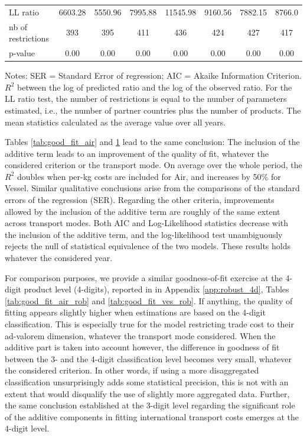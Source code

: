 \documentclass[a4paper,11pt]{article}
\begin{document}
\begin{table}[htbp]
{\begin{center}
\begin{tabular}{l|cccccc|c}
    LL ratio & \multicolumn{1}{c}{6603.28} & \multicolumn{1}{c}{5550.96} & \multicolumn{1}{c}{7995.88} & \multicolumn{1}{c}{11545.98} & 9160.56 & \multicolumn{1}{c}{7882.15} & 8766.0 \\
    nb of restrictions & \multicolumn{1}{c}{393} & \multicolumn{1}{c}{395} & \multicolumn{1}{c}{411} & \multicolumn{1}{c}{436} & 424   & \multicolumn{1}{c}{427} & 417 \\
    p-value& \multicolumn{1}{c}{0.00} & \multicolumn{1}{c}{0.00} & \multicolumn{1}{c}{0.00} & \multicolumn{1}{c}{0.00} & 0.00  & \multicolumn{1}{c}{0.00} & 0.00 \\
    \hline \hline
    \end{tabular}%
    \end{center}}
  \label{tab:good_fit_vessel}%
  \parbox[l]{12cm}{\tiny{Notes: SER = Standard Error of regression; AIC = Akaike Information Criterion. $R^{2}$ between the log of predicted ratio and the log of the observed ratio. For the LL ratio test, the number of restrictions is equal to the number of parameters estimated, i.e., the number of partner countries plus the number of products. The mean statistics calculated as the average value over all years. }}
\end{table}%


Tables \ref{tab:good_fit_air} and \ref{tab:good_fit_vessel} lead to the same conclusion: The inclusion of the additive term leads to an improvement of the quality of fit, whatever the considered criterion or the transport mode. On average over the whole period, the $R^{2}$ doubles when per-kg costs are included for Air, and increases by 50\% for Vessel. Similar qualitative conclusions arise from the comparisons of the standard errors of the regression (SER). Regarding the other criteria, improvements allowed by the inclusion of the additive term are roughly of the same extent across transport modes. Both AIC and Log-Likelihood statistics decrease with the inclusion of the additive term, and the log-likelihood test unambiguously rejects the null of statistical equivalence of the two models. These results holds whatever the considered year.\smallskip


For comparison purposes, we provide a similar goodness-of-fit exercise at the 4-digit product level (4-digits), reported in in Appendix \ref{app:robust_4d}, Tables \ref{tab:good_fit_air_rob} and \ref{tab:good_fit_ves_rob}. If anything, the quality of fitting appears slightly higher when estimations are based on the 4-digit classification. This is especially true for the model restricting trade cost to their ad-valorem dimension, whatever the transport mode considered. When the additive part is taken into account however, the difference in goodness of fit between the 3- and the 4-digit classification level becomes very small, whatever the considered criterion. In other words, if using a more disaggregated classification unsurprisingly adds some statistical precision, this is not with an extent that would disqualify the use of slightly more aggregated data. Further, the same conclusion established at the 3-digit level regarding the significant role of the additive components in fitting international transport costs emerges at the 4-digit level.
\end{document}
